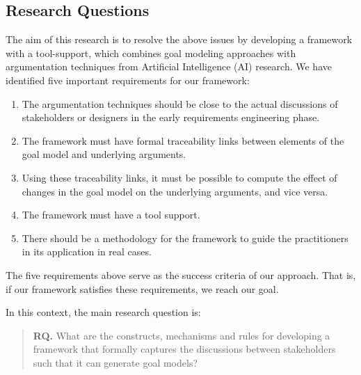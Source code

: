 \subsection{Research Questions}
 
The aim of this research is to resolve the above issues by developing a framework with a tool-support, which combines goal modeling approaches with argumentation techniques from Artificial Intelligence (AI) research\cite{atkinson2007}. We have identified five important requirements for our framework: 
\begin{enumerate}
\item The argumentation techniques should be close to the actual discussions of stakeholders or designers in the early requirements engineering phase.
\item 
The framework must have formal traceability links between elements of the goal model and underlying arguments.
\item 
Using these traceability links, it must be possible to compute the effect of changes in the goal model on the underlying arguments, and vice versa.
\item 
The framework must have a tool support.
\item 
There should be a methodology for the framework to guide the practitioners in its application in real cases.
\end{enumerate}

The five requirements above serve as the success criteria of our approach. That is, if our framework satisfies these requirements, we reach our goal. 

In this context, the main research question is: 

\begin{quote}
\textbf{RQ.} What are the constructs, mechanisms and rules for developing a framework that formally captures the discussions between stakeholders such that it can generate goal models?
\end{quote}


